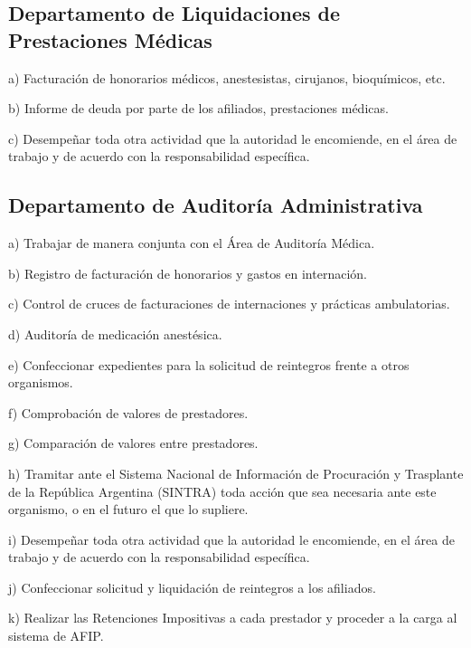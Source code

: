 \subsection{Departamento de Liquidaciones de Prestaciones Médicas}
\begin{displayquote}
a) Facturación de honorarios médicos, anestesistas, cirujanos, bioquímicos, etc.

b) Informe de deuda por parte de los afiliados, prestaciones médicas.

c) Desempeñar toda otra actividad que la autoridad le encomiende, en el área de trabajo y de acuerdo con la responsabilidad específica.
\hfill\parencite{CSOrd17}
\end{displayquote}

\subsection{Departamento de Auditoría Administrativa}
\begin{displayquote}
a) Trabajar de manera conjunta con el Área de Auditoría Médica.

b) Registro de facturación de honorarios y gastos en internación.

c) Control de cruces de facturaciones de internaciones y prácticas ambulatorias.

d) Auditoría de medicación anestésica.

e) Confeccionar expedientes para la solicitud de reintegros frente a otros organismos.

f) Comprobación de valores de prestadores.

g) Comparación de valores entre prestadores.

h) Tramitar ante el Sistema Nacional de Información de Procuración y Trasplante de la República Argentina (SINTRA) toda acción que sea necesaria ante este organismo, o en el futuro el que lo supliere.

i) Desempeñar toda otra actividad que la autoridad le encomiende, en el área de trabajo y de acuerdo con la responsabilidad específica.

j) Confeccionar solicitud y liquidación de reintegros a los afiliados.

k) Realizar las Retenciones Impositivas a cada prestador y proceder a la carga al sistema de AFIP.
\hfill\parencite{CSOrd17}
\end{displayquote}

